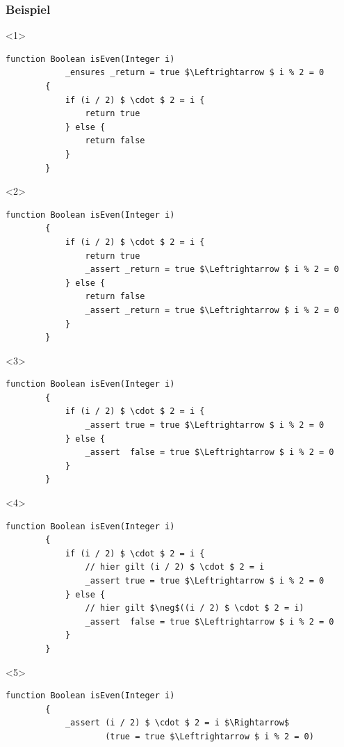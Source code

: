 \documentclass[t,svgnames]{beamer}
\begin{document}
\begin{frame}[fragile]
	\frametitle{Beispiel}
	
	\begin{onlyenv}
	\begin{lstlisting}[frame=lines,mathescape=true]
		function Boolean isEven(Integer i)
		    _ensures _return = true $\Leftrightarrow $ i % 2 = 0
		{
		    if (i / 2) $ \cdot $ 2 = i {
		        return true
		    } else {
		        return false
		    }
		}
	\end{lstlisting}
	\end{onlyenv}
	
	\begin{onlyenv}
	\begin{lstlisting}[frame=lines,mathescape=true]
		function Boolean isEven(Integer i)
		{
		    if (i / 2) $ \cdot $ 2 = i {
		        return true
		        _assert _return = true $\Leftrightarrow $ i % 2 = 0
		    } else {
		        return false
		        _assert _return = true $\Leftrightarrow $ i % 2 = 0
		    }
		}
	\end{lstlisting}
	\end{onlyenv}
	
	\begin{onlyenv}
	\begin{lstlisting}[frame=lines,mathescape=true]
		function Boolean isEven(Integer i)
		{
		    if (i / 2) $ \cdot $ 2 = i {
		        _assert true = true $\Leftrightarrow $ i % 2 = 0
		    } else {
		        _assert  false = true $\Leftrightarrow $ i % 2 = 0
		    }
		}
	\end{lstlisting}
	\end{onlyenv}
	
		\begin{onlyenv}<4>
	\begin{lstlisting}[frame=lines,mathescape=true]
		function Boolean isEven(Integer i)
		{
		    if (i / 2) $ \cdot $ 2 = i {
		        // hier gilt (i / 2) $ \cdot $ 2 = i
		        _assert true = true $\Leftrightarrow $ i % 2 = 0
		    } else {
		        // hier gilt $\neg$((i / 2) $ \cdot $ 2 = i)
		        _assert  false = true $\Leftrightarrow $ i % 2 = 0
		    }
		}
	\end{lstlisting}
	\end{onlyenv}
	
		\begin{onlyenv}<5>
	\begin{lstlisting}[frame=lines,mathescape=true]
		function Boolean isEven(Integer i)
		{
		    _assert (i / 2) $ \cdot $ 2 = i $\Rightarrow$
		        	(true = true $\Leftrightarrow $ i % 2 = 0)
		        	

\end{lstlisting}
\end{onlyenv}
\end{frame}
\end{document}
